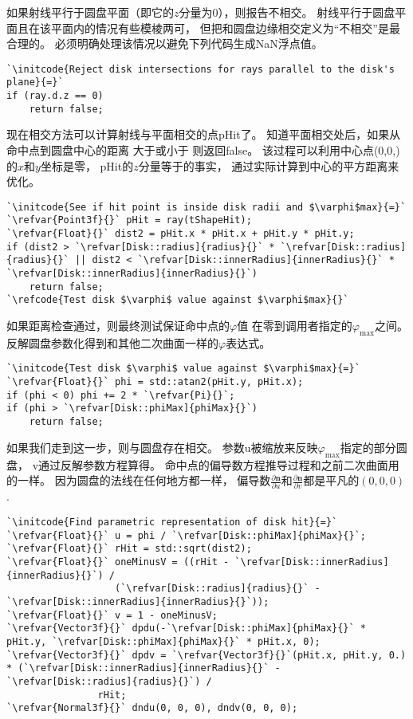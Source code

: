 如果射线平行于圆盘平面（即它的$z$分量为0），则报告不相交。
射线平行于圆盘平面且在该平面内的情况有些模棱两可，
但把和圆盘边缘相交定义为“不相交”是最合理的。
必须明确处理该情况以避免下列代码生成NaN浮点值。
\begin{lstlisting}
`\initcode{Reject disk intersections for rays parallel to the disk's plane}{=}`
if (ray.d.z == 0)
    return false;
\end{lstlisting}

现在相交方法可以计算射线与平面相交的点{\ttfamily pHit}了。
知道平面相交处后，如果从命中点到圆盘中心的距离
大于或小于
则返回{\ttfamily false}。
该过程可以利用中心点{\ttfamily (0,0,)}的$x$和$y$坐标是零，
{\ttfamily pHit}的$z$分量等于的事实，
通过实际计算到中心的平方距离来优化。
\begin{lstlisting}
`\initcode{See if hit point is inside disk radii and $\varphi$max}{=}`
`\refvar{Point3f}{}` pHit = ray(tShapeHit);
`\refvar{Float}{}` dist2 = pHit.x * pHit.x + pHit.y * pHit.y;
if (dist2 > `\refvar[Disk::radius]{radius}{}` * `\refvar[Disk::radius]{radius}{}` || dist2 < `\refvar[Disk::innerRadius]{innerRadius}{}` * `\refvar[Disk::innerRadius]{innerRadius}{}`)
    return false;
`\refcode{Test disk $\varphi$ value against $\varphi$max}{}`
\end{lstlisting}

如果距离检查通过，则最终测试保证命中点的$\varphi$值
在零到调用者指定的$\varphi_{\max}$之间。
反解圆盘参数化得到和其他二次曲面一样的$\varphi$表达式。
\begin{lstlisting}
`\initcode{Test disk $\varphi$ value against $\varphi$max}{=}`
`\refvar{Float}{}` phi = std::atan2(pHit.y, pHit.x);
if (phi < 0) phi += 2 * `\refvar{Pi}{}`;
if (phi > `\refvar[Disk::phiMax]{phiMax}{}`)
    return false;
\end{lstlisting}

如果我们走到这一步，则与圆盘存在相交。
参数{\ttfamily u}被缩放来反映$\varphi_{\max}$指定的部分圆盘，
{\ttfamily v}通过反解参数方程算得。
命中点的偏导数方程推导过程和之前二次曲面用的一样。
因为圆盘的法线在任何地方都一样，
偏导数$\displaystyle\frac{\partial\bm n}{\partial u}$和$\displaystyle\frac{\partial\bm n}{\partial v}$都是平凡的$(0,0,0)$.
\begin{lstlisting}
`\initcode{Find parametric representation of disk hit}{=}`
`\refvar{Float}{}` u = phi / `\refvar[Disk::phiMax]{phiMax}{}`;
`\refvar{Float}{}` rHit = std::sqrt(dist2);
`\refvar{Float}{}` oneMinusV = ((rHit - `\refvar[Disk::innerRadius]{innerRadius}{}`) /
                   (`\refvar[Disk::radius]{radius}{}` - `\refvar[Disk::innerRadius]{innerRadius}{}`));
`\refvar{Float}{}` v = 1 - oneMinusV;
`\refvar{Vector3f}{}` dpdu(-`\refvar[Disk::phiMax]{phiMax}{}` * pHit.y, `\refvar[Disk::phiMax]{phiMax}{}` * pHit.x, 0);
`\refvar{Vector3f}{}` dpdv = `\refvar{Vector3f}{}`(pHit.x, pHit.y, 0.) * (`\refvar[Disk::innerRadius]{innerRadius}{}` - `\refvar[Disk::radius]{radius}{}`) /
                rHit;
`\refvar{Normal3f}{}` dndu(0, 0, 0), dndv(0, 0, 0);
\end{lstlisting}

